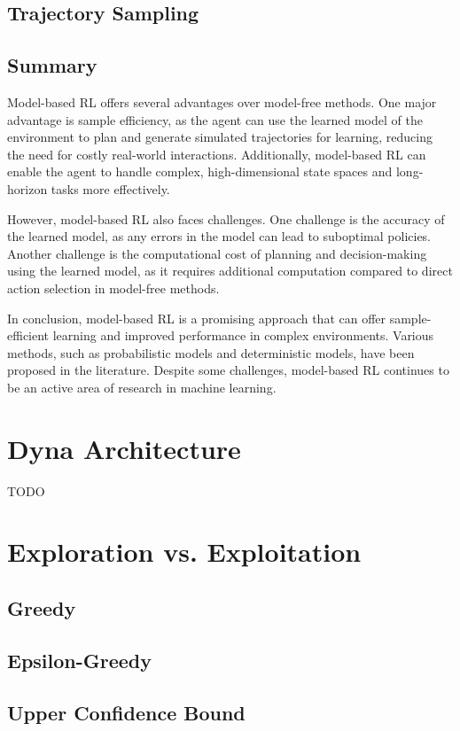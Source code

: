 \documentclass[../xlapes02]{subfiles}
\begin{document}
    \subsection{Trajectory Sampling}\label{subsec:trajectory-sampling}

    \subsection{Summary}\label{subsec:summary}

    Model-based RL offers several advantages over model-free methods. One major advantage is sample efficiency, as the agent can use the learned model of the environment to plan and generate simulated trajectories for learning, reducing the need for costly real-world interactions. Additionally, model-based RL can enable the agent to handle complex, high-dimensional state spaces and long-horizon tasks more effectively.

    However, model-based RL also faces challenges. One challenge is the accuracy of the learned model, as any errors in the model can lead to suboptimal policies. Another challenge is the computational cost of planning and decision-making using the learned model, as it requires additional computation compared to direct action selection in model-free methods.

    In conclusion, model-based RL is a promising approach that can offer sample-efficient learning and improved performance in complex environments. Various methods, such as probabilistic models and deterministic models, have been proposed in the literature. Despite some challenges, model-based RL continues to be an active area of research in machine learning.


    \section{Dyna Architecture}\label{sec:dyna-architecture}
    TODO


    \section{Exploration vs. Exploitation}\label{sec:exploration-vs-exploitation}

    \subsection{Greedy}\label{subsec:greedy}

    \subsection{Epsilon-Greedy}\label{subsec:epsilon-greedy}

    \subsection{Upper Confidence Bound}\label{subsec:upper-confidence-bound}


\end{document}

